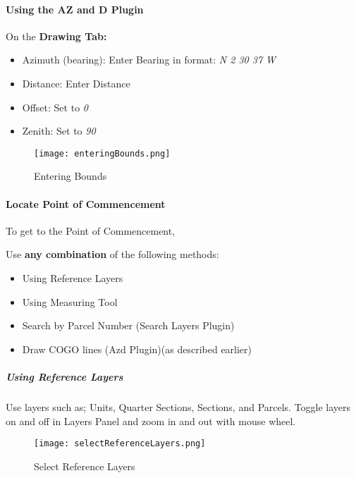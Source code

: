 \paragraph{Using the AZ and D Plugin}
\vspace{.5in}

On the \textbf{Drawing Tab:}
\begin{itemize}
\item Azimuth (bearing): Enter Bearing in format:\emph{ N 2 30 37 W}
\item Distance: Enter Distance
\item Offset: Set to \emph{0}
\item Zenith: Set to \emph{90}
\end{itemize}
\begin{figure}[H]
\centering
    \texttt{[image: enteringBounds.png]}
\vspace{-.1in}

\caption{Entering Bounds}
\end{figure}

\clearpage

\paragraph{Locate Point of Commencement}
\vspace{.4in}

\noindent To get to the Point of Commencement,
\vspace{.2in}

\noindent Use \textbf{any combination} of the following methods:
\begin{itemize}
\item{Using Reference Layers}
\item{Using Measuring Tool}
\item{Search by Parcel Number \small(Search Layers Plugin)}
\item{Draw COGO lines \small(Azd Plugin)}\small(as described earlier)
\end{itemize}
\vspace{.2in}

\subparagraph{Using Reference Layers}
\vspace{.2in}

Use layers such as; Units, Quarter Sections, Sections, and Parcels.
\noindent Toggle layers on and off in Layers Panel and zoom in and out with mouse wheel.
\begin{figure}[H]
\centering
\texttt{[image: selectReferenceLayers.png]}
\vspace{-.1in}

\caption{Select Reference Layers}
\end{figure}
\clearpage

